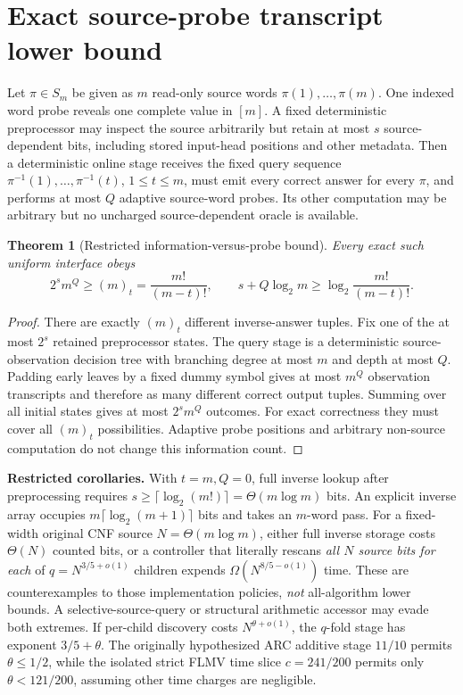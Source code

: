 \documentclass[10pt]{article}
\newtheorem{theorem}{Theorem}
\begin{document}
\section{Exact source-probe transcript lower bound}
Let $\pi\in S_m$ be given as $m$ read-only source words $\pi(1),\ldots,\pi(m)$. One indexed word probe reveals one complete value in $[m]$. A fixed deterministic preprocessor may inspect the source arbitrarily but retain at most $s$ source-dependent bits, including stored input-head positions and other metadata. Then a deterministic online stage receives the fixed query sequence $\pi^{-1}(1),\ldots,\pi^{-1}(t)$, $1\le t\le m$, must emit every correct answer for every $\pi$, and performs at most $Q$ adaptive source-word probes. Its other computation may be arbitrary but no uncharged source-dependent oracle is available.
\begin{theorem}[Restricted information-versus-probe bound]
Every exact such uniform interface obeys
\[
\boxed{2^s m^Q\ge(m)_t=\frac{m!}{(m-t)!}},\qquad
\boxed{s+Q\log_2m\ge\log_2\frac{m!}{(m-t)!}}.
\]
\end{theorem}
\begin{proof}
There are exactly $(m)_t$ different inverse-answer tuples. Fix one of the at most $2^s$ retained preprocessor states. The query stage is a deterministic source-observation decision tree with branching degree at most $m$ and depth at most $Q$. Padding early leaves by a fixed dummy symbol gives at most $m^Q$ observation transcripts and therefore as many different correct output tuples. Summing over all initial states gives at most $2^sm^Q$ outcomes. For exact correctness they must cover all $(m)_t$ possibilities. Adaptive probe positions and arbitrary non-source computation do not change this information count.
\end{proof}
\noindent\textbf{Restricted corollaries.} With $t=m,Q=0$, full inverse lookup after preprocessing requires $s\ge\lceil\log_2(m!)\rceil=\Theta(m\log m)$ bits. An explicit inverse array occupies $m\lceil\log_2(m+1)\rceil$ bits and takes an $m$-word pass. For a fixed-width original CNF source $N=\Theta(m\log m)$, either full inverse storage costs $\Theta(N)$ counted bits, or a controller that literally rescans \emph{all $N$ source bits for each} of $q=N^{3/5+o(1)}$ children expends $\Omega(N^{8/5-o(1)})$ time. These are counterexamples to those implementation policies, \emph{not} all-algorithm lower bounds. A selective-source-query or structural arithmetic accessor may evade both extremes. If per-child discovery costs $N^{\theta+o(1)}$, the $q$-fold stage has exponent $3/5+\theta$. The originally hypothesized ARC additive stage $11/10$ permits $\theta\le1/2$, while the isolated strict FLMV time slice $c=241/200$ permits only $\theta<121/200$, assuming other time charges are negligible.
\end{document}
